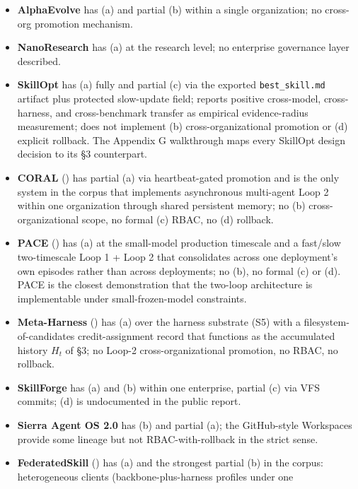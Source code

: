 \documentclass[
]{article}
\providecommand{\tightlist}{%
  \setlength{\itemsep}{0pt}\setlength{\parskip}{0pt}}
\begin{document}
\begin{itemize}
\tightlist
\item
  \textbf{AlphaEvolve} has (a) and partial (b) within a single
  organization; no cross-org promotion mechanism.
\item
  \textbf{NanoResearch} has (a) at the research level; no enterprise
  governance layer described.
\item
  \textbf{SkillOpt} has (a) fully and partial (c) via the exported
  \texttt{best\_skill.md} artifact plus protected slow-update field;
  reports positive cross-model, cross-harness, and cross-benchmark
  transfer as empirical evidence-radius measurement; does not implement
  (b) cross-organizational promotion or (d) explicit rollback. The
  Appendix G walkthrough maps every SkillOpt design decision to its §3
  counterpart.
\item
  \textbf{CORAL} () has
  partial (a) via heartbeat-gated promotion and is the only system in
  the corpus that implements asynchronous multi-agent Loop 2 within one
  organization through shared persistent memory; no (b)
  cross-organizational scope, no formal (c) RBAC, no (d) rollback.
\item
  \textbf{PACE} () has (a)
  at the small-model production timescale and a fast/slow two-timescale
  Loop 1 + Loop 2 that consolidates across one deployment's own episodes
  rather than across deployments; no (b), no formal (c) or (d). PACE is
  the closest demonstration that the two-loop architecture is
  implementable under small-frozen-model constraints.
\item
  \textbf{Meta-Harness} () has (a) over the harness substrate (S5) with a
  filesystem-of-candidates credit-assignment record that functions as
  the accumulated history \(H_t\) of §3; no Loop-2 cross-organizational
  promotion, no RBAC, no rollback.
\item
  \textbf{SkillForge} has (a) and (b) within one enterprise, partial (c)
  via VFS commits; (d) is undocumented in the public report.
\item
  \textbf{Sierra Agent OS 2.0} has (b) and partial (a); the GitHub-style
  Workspaces provide some lineage but not RBAC-with-rollback in the
  strict sense.
\item
  \textbf{FederatedSkill} () has (a) and the strongest partial (b) in the corpus:
  heterogeneous clients (backbone-plus-harness profiles under one

\end{itemize}
\end{document}
